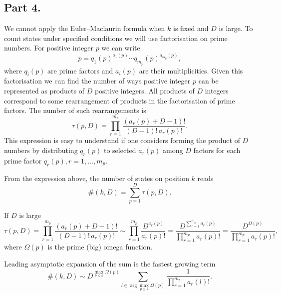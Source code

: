 \documentclass{article}
\begin{document}
\subsection{Part 4.}
We cannot apply the Euler–Maclaurin formula when $k$ is fixed and $D$ is large. To count states under specified conditions we will use factorisation on prime numbers. For positive integer $p$ we can write
\begin{equation}
	p = q_{1}(p)^{a_1(p)}\cdots q_{m_p}(p)^{a_{m_{p}}(p)},
\end{equation}
where $q_i(p)$ are prime factors and $a_i(p)$ are their multiplicities. Given this factorisation we can find the number of ways positive integer $p$ can be represented as products of $D$ positive integers. All products of $D$ integers correspond to some rearrangement of products in the factorisation of prime factors. The number of such rearrangements is
\begin{equation}
	\tau(p, D) = \prod_{r=1}^{m_{p}}\frac{(a_r(p) + D - 1)!}{(D-1)!\,a_{r}(p)!}.
\end{equation}
This expression is easy to understand if one considers forming the product of $D$ numbers by distributing $q_r(p)$ to selected $a_r(p)$ among $D$ factors for each prime factor $q_r(p), r=1,\dots,m_{p}$.

From the expression above, the number of states on position $k$ reads
\begin{equation}
	\#(k, D) = \sum_{p=1}^{D} \tau(p, D).
\end{equation}

If $D$ is large
\begin{equation}
	\tau(p, D) = \prod_{r=1}^{m_{p}}\frac{(a_r(p) + D - 1)!}{(D-1)!\,a_{r}(p)!} \sim \prod_{r=1}^{m_{p}} \frac{D^{a_r(p)}}{a_r(p)!} = \frac{D^{\sum_{r=1}^{m_{p}}a_{r}(p)}}{\prod_{r=1}^{m_{p}}a_r(p)!} = \frac{D^{\Omega(p)}}{\prod_{r=1}^{m_{p}}a_r(p)!},
\end{equation}
where $\Omega(p)$ is the prime (big) omega function.

Leading asymptotic expansion of the sum is the fastest growing term
\begin{equation}
	\#(k, D) \sim D^{\max_{p\leq k} \Omega(p)} \sum_{l \in \arg\max_{p\leq k} \Omega(p)} \frac{1}{\prod_{r=1}^{m_{l}}a_r(l)!}.
\end{equation}
\end{document}
